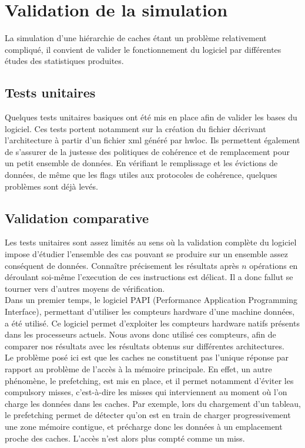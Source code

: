 \section{Validation de la simulation}
La simulation d'une hiérarchie de caches étant un problème relativement compliqué, il convient de valider le fonctionnement du logiciel par différentes études des statistiques produites.

\subsection{Tests unitaires}

Quelques tests unitaires basiques ont été mis en place afin de valider les bases du logiciel. Ces tests portent notamment sur la création du fichier décrivant l'architecture à partir d'un fichier xml généré par hwloc. Ils permettent également de s'assurer de la justesse des politiques de cohérence et de remplacement pour un petit ensemble de données. En vérifiant le remplissage et les évictions de données, de même que les flags utiles aux protocoles de cohérence, quelques problèmes sont déjà levés.

\subsection{Validation comparative}
Les tests unitaires sont assez limités au sens où la validation complète du logiciel impose d'étudier l'ensemble des cas pouvant se produire sur un ensemble assez conséquent de données. Connaître précisement les résultats après $n$ opérations en déroulant soi-même l'execution de ces instructions est délicat. Il a donc fallut se tourner vers d'autres moyens de vérification. \\

Dans un premier temps, le logiciel PAPI (Performance Application Programming Interface), permettant d'utiliser les compteurs hardware d'une machine données, a été utilisé. Ce logiciel permet d'exploiter les compteurs hardware natifs présents dans les processeurs actuels. Nous avons donc utilisé ces compteurs, afin de comparer nos résultats avec les résultats obtenus sur différentes architectures. \\

Le problème posé ici est que les caches ne constituent pas l'unique réponse par rapport au problème de l'accès à la mémoire principale. En effet, un autre phénomène, le prefetching, est mis en place, et il permet notamment d'éviter les compulsory misses, c'est-à-dire les misses qui interviennent au moment où l'on charge les données dans les caches. Par exemple, lors du chargement d'un tableau, le prefetching permet de détecter qu'on est en train de charger progressivement une zone mémoire contigue, et précharge donc les données à un emplacement proche des caches. L'accès n'est alors plus compté comme un miss. \\

